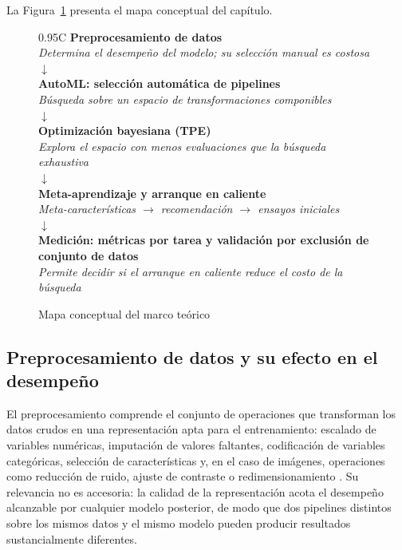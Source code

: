 \documentclass[12pt,letterpaper,oneside]{article}
\begin{document}
La Figura~\ref{fig:mapa-conceptual} presenta el mapa conceptual del capítulo.

\begin{figure}[H]
\centering
\begin{tabularx}{0.95\textwidth}{C}
\toprule
\textbf{Preprocesamiento de datos} \\
\emph{Determina el desempeño del modelo; su selección manual es costosa} \\
\midrule
$\downarrow$ \\
\midrule
\textbf{AutoML: selección automática de pipelines} \\
\emph{Búsqueda sobre un espacio de transformaciones componibles} \\
\midrule
$\downarrow$ \\
\midrule
\textbf{Optimización bayesiana (TPE)} \\
\emph{Explora el espacio con menos evaluaciones que la búsqueda exhaustiva} \\
\midrule
$\downarrow$ \\
\midrule
\textbf{Meta-aprendizaje y arranque en caliente} \\
\emph{Meta-características $\rightarrow$ recomendación $\rightarrow$ ensayos iniciales} \\
\midrule
$\downarrow$ \\
\midrule
\textbf{Medición: métricas por tarea y validación por exclusión de conjunto de datos} \\
\emph{Permite decidir si el arranque en caliente reduce el costo de la búsqueda} \\
\bottomrule
\end{tabularx}
\caption{Mapa conceptual del marco teórico}
\label{fig:mapa-conceptual}
\end{figure}

\subsection{Preprocesamiento de datos y su efecto en el desempeño}

El preprocesamiento comprende el conjunto de operaciones que transforman los datos crudos
en una representación apta para el entrenamiento: escalado de variables numéricas,
imputación de valores faltantes, codificación de variables categóricas, selección de
características y, en el caso de imágenes, operaciones como reducción de ruido, ajuste de
contraste o redimensionamiento \cite{garcia2015preprocessing}. Su relevancia no es
accesoria: la calidad de la representación acota el desempeño alcanzable por cualquier
modelo posterior, de modo que dos pipelines distintos sobre los mismos datos y el mismo
modelo pueden producir resultados sustancialmente diferentes.
\end{document}
